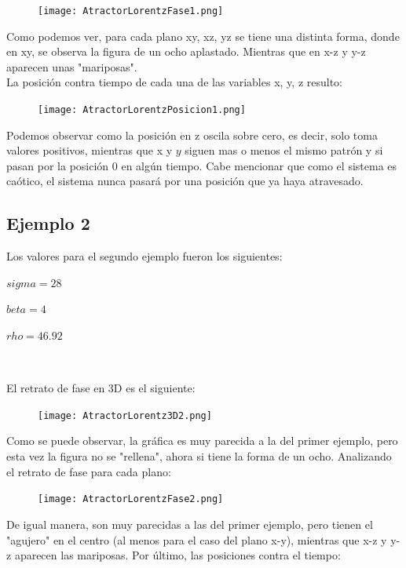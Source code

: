 \documentclass[12pt]{article}
\begin{document}
\begin{figure}[h!]
    \centering
\texttt{[image: AtractorLorentzFase1.png]}
\end{figure}

Como podemos ver, para cada plano xy, xz, yz se tiene una distinta forma, donde en xy, se observa la figura de un ocho aplastado. Mientras que en x-z y y-z aparecen unas "mariposas".\\

La posición contra tiempo de cada una de las variables x, y, z resulto: 

\pagebreak

\begin{figure}[h!]
    \centering
\texttt{[image: AtractorLorentzPosicion1.png]}
\end{figure}

Podemos observar como la posición en z oscila sobre cero, es decir, solo toma valores positivos, mientras que x y $y$ siguen mas o menos el mismo patrón y si pasan por la posición 0 en algún tiempo. Cabe mencionar que como el sistema es caótico, el sistema nunca pasará por una posición que ya haya atravesado. 

\subsection{Ejemplo 2}
Los valores para el segundo ejemplo fueron los siguientes: \\

\centerline{$ sigma = 28$}
\centerline{$ beta = 4$}
\centerline{$ rho = 46.92$}
$    $

El retrato de fase en 3D es el siguiente:

\begin{figure}[h!]
    \centering
\texttt{[image: AtractorLorentz3D2.png]}
\end{figure}

Como se puede observar, la gráfica es muy parecida a la del primer ejemplo, pero esta vez la figura no se "rellena", ahora si tiene la forma de un ocho. Analizando el retrato de fase para cada plano:

\begin{figure}[h!]
    \centering
\texttt{[image: AtractorLorentzFase2.png]}
\end{figure}

De igual manera, son muy parecidas a las del primer ejemplo, pero tienen el "agujero" en el centro (al menos para el caso del plano x-y), mientras que x-z y y-z aparecen las mariposas. Por último, las posiciones contra el tiempo:
\end{document}
